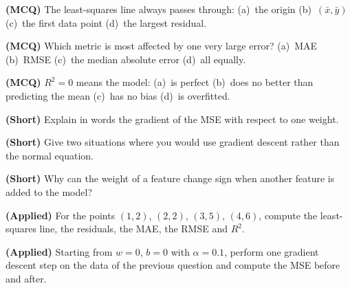 \begin{reviewq}
  \item \textbf{(MCQ)} The least-squares line always passes through:
        (a)~the origin (b)~$(\bar{x}, \bar{y})$ (c)~the first data point (d)~the
        largest residual.
  \item \textbf{(MCQ)} Which metric is most affected by one very large error?
        (a)~MAE (b)~RMSE (c)~the median absolute error (d)~all equally.
  \item \textbf{(MCQ)} $R^2 = 0$ means the model: (a)~is perfect (b)~does no better
        than predicting the mean (c)~has no bias (d)~is overfitted.
  \item \textbf{(Short)} Explain in words the gradient of the MSE with respect to
        one weight.
  \item \textbf{(Short)} Give two situations where you would use gradient descent
        rather than the normal equation.
  \item \textbf{(Short)} Why can the weight of a feature change sign when another
        feature is added to the model?
  \item \textbf{(Applied)} For the points $(1, 2)$, $(2, 2)$, $(3, 5)$, $(4, 6)$,
        compute the least-squares line, the residuals, the MAE, the RMSE and $R^2$.
  \item \textbf{(Applied)} Starting from $w = 0$, $b = 0$ with $\alpha = 0.1$,
        perform one gradient descent step on the data of the previous question
        and compute the MSE before and after.
\end{reviewq}
